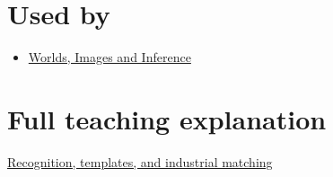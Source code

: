 \section{Used by}\label{appendix-5fb4af80d1c7-used-by}

\begin{itemize}
\tightlist
\item
  \href{Continuous\%20Notes/University\%20-\%20Worlds,\%20Images\%20and\%20Inference\%20-\%20Graphics,\%20Vision\%20and\%20Photography}{Worlds, Images and Inference}
\end{itemize}

\section{Full teaching explanation}\label{appendix-5fb4af80d1c7-full-teaching-explanation}

\href{Continuous\%20Notes/University\%20-\%20Worlds,\%20Images\%20and\%20Inference\%20-\%20Graphics,\%20Vision\%20and\%20Photography\#Recognition,\%20templates,\%20and\%20industrial\%20matching}{Recognition, templates, and industrial matching}
